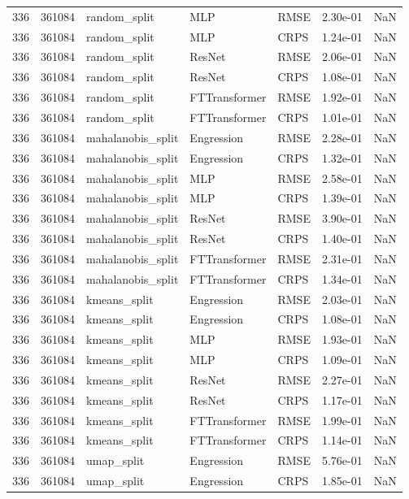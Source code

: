 \begin{tabular}{rrlllrr}
336 & 361084 & random\_split & MLP & RMSE & 2.30e-01 & NaN \\
336 & 361084 & random\_split & MLP & CRPS & 1.24e-01 & NaN \\
336 & 361084 & random\_split & ResNet & RMSE & 2.06e-01 & NaN \\
336 & 361084 & random\_split & ResNet & CRPS & 1.08e-01 & NaN \\
336 & 361084 & random\_split & FTTransformer & RMSE & 1.92e-01 & NaN \\
336 & 361084 & random\_split & FTTransformer & CRPS & 1.01e-01 & NaN \\
336 & 361084 & mahalanobis\_split & Engression & RMSE & 2.28e-01 & NaN \\
336 & 361084 & mahalanobis\_split & Engression & CRPS & 1.32e-01 & NaN \\
336 & 361084 & mahalanobis\_split & MLP & RMSE & 2.58e-01 & NaN \\
336 & 361084 & mahalanobis\_split & MLP & CRPS & 1.39e-01 & NaN \\
336 & 361084 & mahalanobis\_split & ResNet & RMSE & 3.90e-01 & NaN \\
336 & 361084 & mahalanobis\_split & ResNet & CRPS & 1.40e-01 & NaN \\
336 & 361084 & mahalanobis\_split & FTTransformer & RMSE & 2.31e-01 & NaN \\
336 & 361084 & mahalanobis\_split & FTTransformer & CRPS & 1.34e-01 & NaN \\
336 & 361084 & kmeans\_split & Engression & RMSE & 2.03e-01 & NaN \\
336 & 361084 & kmeans\_split & Engression & CRPS & 1.08e-01 & NaN \\
336 & 361084 & kmeans\_split & MLP & RMSE & 1.93e-01 & NaN \\
336 & 361084 & kmeans\_split & MLP & CRPS & 1.09e-01 & NaN \\
336 & 361084 & kmeans\_split & ResNet & RMSE & 2.27e-01 & NaN \\
336 & 361084 & kmeans\_split & ResNet & CRPS & 1.17e-01 & NaN \\
336 & 361084 & kmeans\_split & FTTransformer & RMSE & 1.99e-01 & NaN \\
336 & 361084 & kmeans\_split & FTTransformer & CRPS & 1.14e-01 & NaN \\
336 & 361084 & umap\_split & Engression & RMSE & 5.76e-01 & NaN \\
336 & 361084 & umap\_split & Engression & CRPS & 1.85e-01 & NaN \\

\end{tabular}
